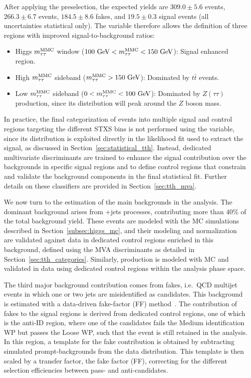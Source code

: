 After applying the preselection, the expected yields are $309.0 \pm 5.6$ \ztautau events, $266.3 \pm 6.7$ \ttbar events, $184.5 \pm 8.6$ fakes, and $19.5 \pm 0.3$ \ttHtt signal events (all uncertainties statistical only). The \mmc variable therefore allows the definition of three regions with improved signal-to-background ratios:
\begin{itemize}
    \small
    \item Higgs $m^\text{MMC}_{\tau\tau}$ window ($100~\text{GeV} < m^\text{MMC}_{\tau\tau} < 150~\text{GeV}$): Signal enhanced region.
    \item High $m^\text{MMC}_{\tau\tau}$ sideband ($m^\text{MMC}_{\tau\tau} > 150~\text{GeV}$): Dominated by $t\bar{t}$ events.
    \item Low $m^\text{MMC}_{\tau\tau}$ sideband ($0 < m^\text{MMC}_{\tau\tau} < 100~\text{GeV}$): Dominated by $Z(\tau\tau)$ production, since its distribution will peak around the $Z$ boson mass.
\end{itemize}

In practice, the final categorization of events into multiple signal and control regions targeting the different STXS bins is not performed using the \mmc variable, since its distribution is exploited directly in the likelihood fit used to extract the signal, as discussed in Section~\ref{sec:statistical_tth}. 
Instead, dedicated multivariate discriminants are trained to enhance the signal contribution over the backgrounds in specific signal regions and to define control regions that constrain and validate the background components in the final statistical fit. 
Further details on these classifiers are provided in Section~\ref{sec:tth_mva}.  

We now turn to the estimation of the main backgrounds in the \ttHtt analysis. 
The dominant background arises from \ztautau+jets processes, contributing more than $40\%$ of the total background yield. 
These events are modeled with the MC simulations described in Section~\ref{subsec:higgs_mc}, and their modeling and normalization are validated against data in dedicated control regions enriched in this background, defined using the MVA discriminants as detailed in Section~\ref{sec:tth_categories}. 
Similarly, \ttbar production is modeled with MC and validated in data using dedicated control regions within the analysis phase space.  

The third major background contribution comes from fakes, i.e.\ QCD multijet events in which one or two jets are misidentified as \tauhadvis candidates. 
This background is estimated with a data-driven fake-factor (FF) method~\cite{fakes_paper}. 
The contribution of fakes to the signal regions is derived from dedicated control regions, one of which is the anti-ID region, where one of the \tauhadvis candidates fails the Medium identification WP but passes the Loose WP, such that the event is still retained in the analysis. 
In this region, a template for the fake contribution is obtained by subtracting simulated prompt-\tauhadvis backgrounds from the data distribution. 
This template is then scaled by a transfer factor, the fake factor (FF), correcting for the different selection efficiencies between pass- and anti-\tauhadvis candidates.  

